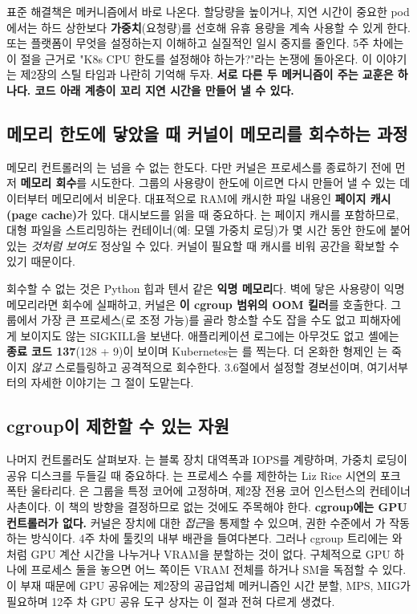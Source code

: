 표준 해결책은 메커니즘에서 바로 나온다. 할당량을 높이거나, 지연 시간이 중요한 pod에서는 하드 상한보다 \textbf{가중치}(요청량)를 선호해 유휴 용량을 계속 사용할 수 있게 한다. 또는 플랫폼이 무엇을 설정하는지 이해하고 실질적인 일시 중지를 줄인다. 5주 차에는 이 절을 근거로 "K8s CPU 한도를 설정해야 하는가?"라는 논쟁에 돌아온다. 이 이야기는 제2장의 스틸 타임과 나란히 기억해 두자. \textbf{서로 다른 두 메커니즘이 주는 교훈은 하나다. 코드 아래 계층이 꼬리 지연 시간을 만들어 낼 수 있다.}

\subsection*{메모리 한도에 닿았을 때 커널이 메모리를 회수하는 과정}

메모리 컨트롤러의 는 넘을 수 없는 한도다. 다만 커널은 프로세스를 종료하기 전에 먼저 \textbf{메모리 회수}를 시도한다. 그룹의 사용량이 한도에 이르면 다시 만들어 낼 수 있는 데이터부터 메모리에서 비운다. 대표적으로 RAM에 캐시한 파일 내용인 \textbf{페이지 캐시(page cache)}가 있다. 대시보드를 읽을 때 중요하다. 는 페이지 캐시를 포함하므로, 대형 파일을 스트리밍하는 컨테이너(예: 모델 가중치 로딩)가 몇 시간 동안 한도에 붙어 있는 \textit{것처럼 보여도} 정상일 수 있다. 커널이 필요할 때 캐시를 비워 공간을 확보할 수 있기 때문이다.

회수할 수 없는 것은 Python 힙과 텐서 같은 \textbf{익명 메모리}다. 벽에 닿은 사용량이 익명 메모리라면 회수에 실패하고, 커널은 \textbf{이 cgroup 범위의 OOM 킬러}를 호출한다. 그룹에서 가장 큰 프로세스(로 조정 가능)를 골라 항소할 수도 잡을 수도 없고 피해자에게 보이지도 않는 SIGKILL을 보낸다. 애플리케이션 로그에는 아무것도 없고 셸에는 \textbf{종료 코드 137}(128 + 9)이 보이며 Kubernetes는 를 찍는다. 더 온화한 형제인 는 죽이지 \textit{않고} 스로틀링하고 공격적으로 회수한다. 3.6절에서 설정할 경보선이며, 여기서부터의 자세한 이야기는 그 절이 도맡는다.

\subsection*{cgroup이 제한할 수 있는 자원}

나머지 컨트롤러도 살펴보자. 는 블록 장치 대역폭과 IOPS를 계량하며, 가중치 로딩이 공유 디스크를 두들길 때 중요하다. 는 프로세스 수를 제한하는 Liz Rice 시연의 포크 폭탄 울타리다. 은 그룹을 특정 코어에 고정하며, 제2장 전용 코어 인스턴스의 컨테이너 사촌이다. 이 책의 방향을 결정하므로 없는 것에도 주목해야 한다. \textbf{cgroup에는 GPU 컨트롤러가 없다.} 커널은  장치에 대한 \textit{접근}을 통제할 수 있으며, 권한 수준에서 가 작동하는 방식이다. 4주 차에 툴킷의 내부 배관을 들여다본다. 그러나 cgroup 트리에는 와 처럼 GPU 계산 시간을 나누거나 VRAM을 분할하는 것이 없다. 구체적으로 GPU 하나에 프로세스 둘을 놓으면 어느 쪽이든 VRAM 전체를 하거나 SM을 독점할 수 있다. 이 부재 때문에 GPU 공유에는 제2장의 공급업체 메커니즘인 시간 분할, MPS, MIG가 필요하며 12주 차 GPU 공유 도구 상자는 이 절과 전혀 다르게 생겼다.

